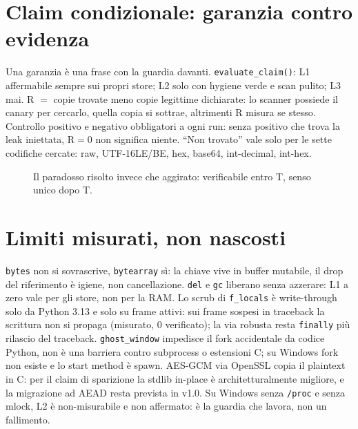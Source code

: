 \documentclass[11pt,a4paper]{article}
\begin{document}
\section{Claim condizionale: garanzia contro evidenza}
Una garanzia \`e una frase con la guardia davanti. \texttt{evaluate\_claim()}:
L1 affermabile sempre sui propri store; L2 solo con hygiene verde e scan pulito;
L3 mai. R $=$ copie trovate meno copie legittime dichiarate: lo scanner possiede
il canary per cercarlo, quella copia si sottrae, altrimenti R misura se stesso.
Controllo positivo e negativo obbligatori a ogni run: senza positivo che trova la
leak iniettata, R$=$0 non significa niente. ``Non trovato'' vale solo per le sette
codifiche cercate: raw, UTF-16LE/BE, hex, base64, int-decimal, int-hex.

\begin{figure}[h]
\centering
{}
\caption{Il paradosso risolto invece che aggirato: verificabile entro T, senso unico dopo T.}
\end{figure}

\section{Limiti misurati, non nascosti}
\texttt{bytes} non si sovrascrive, \texttt{bytearray} s\`i: la chiave vive in buffer
mutabile, il drop del riferimento \`e igiene, non cancellazione. \texttt{del} e
\texttt{gc} liberano senza azzerare: L1 a zero vale per gli store, non per la RAM.
Lo scrub di \texttt{f\_locals} \`e write-through solo da Python 3.13 e solo su frame
attivi: sui frame sospesi in traceback la scrittura non si propaga (misurato, 0
verificato); la via robusta resta \texttt{finally} pi\`u rilascio del traceback.
\texttt{ghost\_window} impedisce il fork accidentale da codice Python, non \`e una
barriera contro subprocess o estensioni C; su Windows fork non esiste e lo start
method \`e spawn. AES-GCM via OpenSSL copia il plaintext in C: per il claim di
sparizione la stdlib in-place \`e architetturalmente migliore, e la migrazione ad
AEAD resta prevista in v1.0. Su Windows senza \texttt{/proc} e senza mlock, L2 \`e
non-misurabile e non affermato: \`e la guardia che lavora, non un fallimento.
\end{document}
